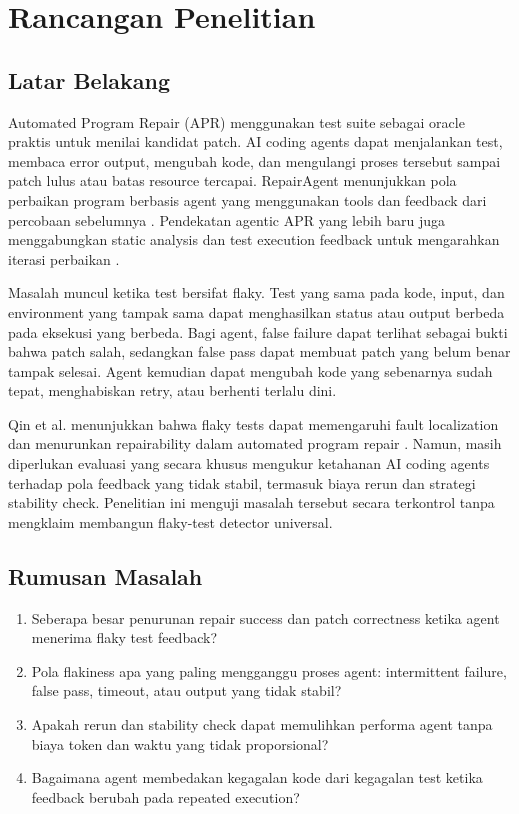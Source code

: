 \chapter{Rancangan Penelitian}

\section{Latar Belakang}

Automated Program Repair (APR) menggunakan test suite sebagai oracle praktis untuk menilai kandidat patch. AI coding agents dapat menjalankan test, membaca error output, mengubah kode, dan mengulangi proses tersebut sampai patch lulus atau batas resource tercapai. RepairAgent menunjukkan pola perbaikan program berbasis agent yang menggunakan tools dan feedback dari percobaan sebelumnya \cite{repairagent2024}. Pendekatan agentic APR yang lebih baru juga menggabungkan static analysis dan test execution feedback untuk mengarahkan iterasi perbaikan \cite{agenticrepair2025}.

Masalah muncul ketika test bersifat flaky. Test yang sama pada kode, input, dan environment yang tampak sama dapat menghasilkan status atau output berbeda pada eksekusi yang berbeda. Bagi agent, false failure dapat terlihat sebagai bukti bahwa patch salah, sedangkan false pass dapat membuat patch yang belum benar tampak selesai. Agent kemudian dapat mengubah kode yang sebenarnya sudah tepat, menghabiskan retry, atau berhenti terlalu dini.

Qin et al. menunjukkan bahwa flaky tests dapat memengaruhi fault localization dan menurunkan repairability dalam automated program repair \cite{qin2021flaky}. Namun, masih diperlukan evaluasi yang secara khusus mengukur ketahanan AI coding agents terhadap pola feedback yang tidak stabil, termasuk biaya rerun dan strategi stability check. Penelitian ini menguji masalah tersebut secara terkontrol tanpa mengklaim membangun flaky-test detector universal.

\section{Rumusan Masalah}

\begin{enumerate}[leftmargin=*]
    \item Seberapa besar penurunan repair success dan patch correctness ketika agent menerima flaky test feedback?
    \item Pola flakiness apa yang paling mengganggu proses agent: intermittent failure, false pass, timeout, atau output yang tidak stabil?
    \item Apakah rerun dan stability check dapat memulihkan performa agent tanpa biaya token dan waktu yang tidak proporsional?
    \item Bagaimana agent membedakan kegagalan kode dari kegagalan test ketika feedback berubah pada repeated execution?
\end{enumerate}

